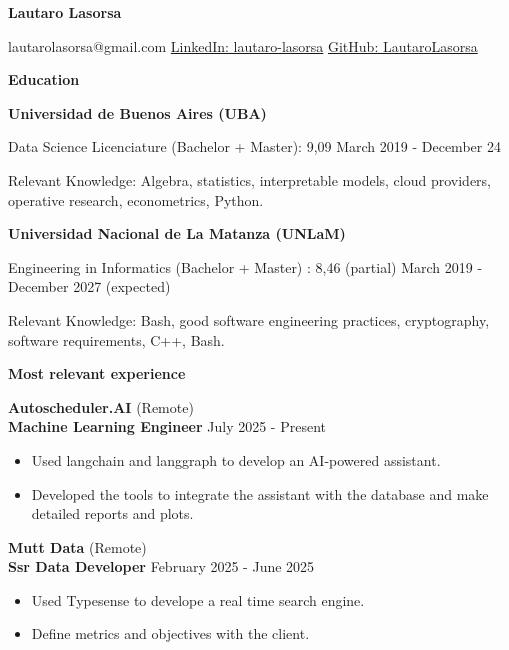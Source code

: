 \documentclass[10pt]{article}
\begin{document}
\begin{center}
    \textbf{Lautaro Lasorsa}\\ 
    \hrulefill
\end{center}

\begin{center}
    lautarolasorsa@gmail.com \textbullet \href{https://www.linkedin.com/in/lautaro-lasorsa/}{LinkedIn: lautaro-lasorsa} \textbullet \href{https://github.com/LautaroLasorsa}{GitHub: LautaroLasorsa}
\end{center}

\vspace{0.5pt}

\begin{center}
    \textbf{Education}
\end{center}
\textbf{Universidad de Buenos Aires (UBA)} 

Data Science Licenciature (Bachelor + Master): 9,09 \hfill March 2019 - December 24 

Relevant Knowledge: Algebra, statistics, interpretable models, cloud providers, operative research, econometrics, Python.



\textbf{Universidad Nacional de La Matanza (UNLaM)} 

Engineering in Informatics (Bachelor + Master) : 8,46 (partial) \hfill March 2019 - December 2027 (expected)

Relevant Knowledge: Bash, good software engineering practices, cryptography, software requirements, C++, Bash.



\begin{center}
    \textbf{Most relevant experience}
\end{center}

\textbf{Autoscheduler.AI} \hfill (Remote)\\
\textbf{Machine Learning Engineer} \hfill July 2025 - Present
\begin{itemize}[noitemsep, topsep=0pt, partopsep=0pt, parsep=0pt]
    \item Used langchain and langgraph to develop an AI-powered assistant.
    \item Developed the tools to integrate the assistant with the database and make detailed reports and plots.
\end{itemize}

\vspace{8pt}

\textbf{Mutt Data} \hfill (Remote)\\
\textbf{Ssr Data Developer} \hfill February 2025 - June 2025
\begin{itemize}[noitemsep, topsep=0pt, partopsep=0pt, parsep=0pt]
    \item Used Typesense to develope a real time search engine.
    \item Define metrics and objectives with the client.
\end{itemize}
\end{document}
